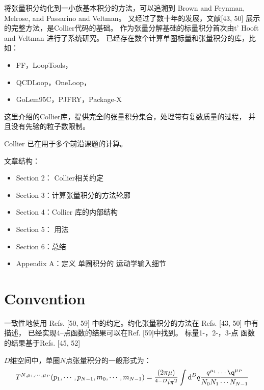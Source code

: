 \documentclass{ctexart}
\newcommand*{\dif}{\mathop{}\!\mathrm{d}}
\begin{document}
将张量积分约化到一小族基本积分的方法，可以追溯到 Brown and Feynman, Melrose, and Passarino and Veltman。
又经过了数十年的发展，文献[43, 50]  展示的完整方法，是Collier代码的基础。
作为张量分解基础的标量积分首次由t' Hooft and Veltman 进行了系统研究。
已经存在数个计算单圈标量和张量积分的库，比如：

\begin{itemize}
    \item FF，LoopTools，
    \item QCDLoop，OneLoop，
    \item GoLem95C，PJFRY，Package-X
\end{itemize}

这里介绍的Collier库，提供完全的张量积分集合，处理带有复数质量的过程，
并且没有先验的粒子数限制。

Collier 已在用于多个前沿课题的计算。

文章结构：

\begin{itemize}
    \item Section 2： Collier相关约定
    \item Section 3：计算张量积分的方法轮廓
    \item Section 4：Collier 库的内部结构
    \item Section 5： 用法
    \item Section 6：总结
    \item Appendix A：定义 单圈积分的 运动学输入细节
\end{itemize}

\section{Convention}

一致性地使用 Refs. [50, 59] 中的约定。约化张量积分的方法在 Refs. [43, 50] 中有描述，
已经实现4--点函数的结果可以在Ref. [59]中找到。
标量1-，2-，3-点 函数的结果基于Refs. [45, 52]

$D$维空间中，单圈$N$点张量积分的一般形式为：
\begin{equation}
    \begin{aligned}      
T^{N,\mu_{1},\cdots, \mu_{P}}(p_{1},\cdots,p_{N-1},m_{0},\cdots,m_{N-1})
=\frac{(2\pi\mu)}{^{4-D}i \pi^2}
\int\dif^D q \frac{q^{\mu_{1}}\cdots\q^{\mu_{P}}}{N_0 N_1 \cdots N_{N-1}}
    \end{aligned}
\end{equation}
\end{document}
